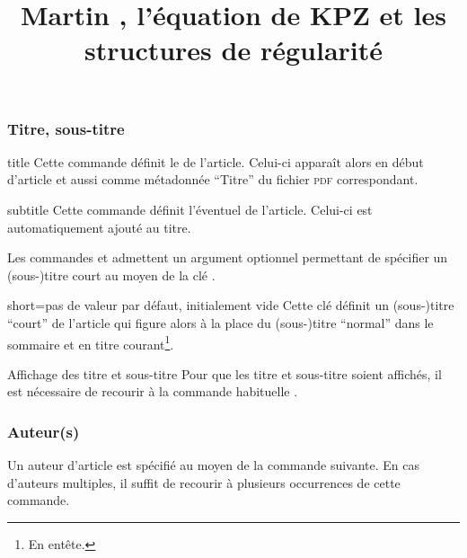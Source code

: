 \subsubsection{Titre, sous-titre}
\label{sec-titre}

\begin{docCommand}[doc description=\mandatory]{title}{}
  Cette commande définit le  de l'article. Celui-ci apparaît alors
  en début d'article et aussi comme métadonnée \enquote{Titre} du fichier
  \textsc{pdf} correspondant.
\end{docCommand}

\begin{docCommand}{subtitle}{}
  Cette commande définit l'éventuel  de l'article. Celui-ci
  est automatiquement ajouté au titre.
\end{docCommand}

Les commandes  et  admettent un argument
optionnel permettant de spécifier un (sous-)titre court au moyen de la clé
.

\begin{docKey}{short}{=}{pas de valeur par défaut,
    initialement vide}
  Cette clé définit un (sous-)titre \enquote{court} de l'article qui figure
  alors à la place du (sous-)titre \enquote{normal} dans le sommaire et en titre
  courant\footnote{En entête.}.
\end{docKey}

\begin{bodycode}
\title[short=Les travaux de Martin \surname{Hairer}]{Martin ,
  l'équation de KPZ et les structures de régularité}
\end{bodycode}

\begin{dbremark}{Affichage des titre et sous-titre}{}
  Pour que les titre et sous-titre soient affichés, il est nécessaire de
  recourir à la commande habituelle .
\end{dbremark}

\subsubsection{Auteur(s)}
\label{sec-auteurs}

Un auteur d'article est spécifié au moyen de la commande 
suivante. En cas d'auteurs multiples, il  suffit de recourir à plusieurs
occurrences de cette commande.

